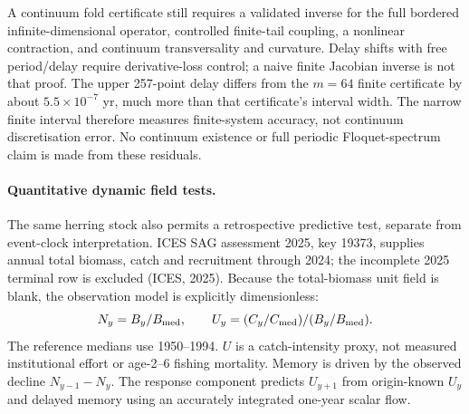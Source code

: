 A continuum fold certificate still requires a validated inverse for the
full bordered infinite-dimensional operator, controlled finite-tail
coupling, a nonlinear contraction, and continuum transversality and
curvature. Delay shifts with free period/delay require derivative-loss
control; a naive finite Jacobian inverse is not that proof. The upper
257-point delay differs from the $m=64$ finite certificate by about
$5.5\times10^{-7}$ yr, much more than that certificate's interval width.
The narrow finite interval therefore measures finite-system accuracy,
not continuum discretisation error. No continuum existence or full
periodic Floquet-spectrum claim is made from these residuals.

\paragraph{Quantitative dynamic field tests.}
The same herring stock also permits a retrospective predictive test,
separate from event-clock interpretation. ICES SAG assessment 2025,
key 19373, supplies annual total biomass, catch and recruitment through
2024; the incomplete 2025 terminal row is excluded (ICES, 2025).
Because the total-biomass unit field is blank, the observation model is
explicitly dimensionless:
\[
 N_y=B_y/B_{\rm med},\qquad
 U_y=(C_y/C_{\rm med})/(B_y/B_{\rm med}).
\]
The reference medians use 1950--1994. $U$ is a catch-intensity proxy,
not measured institutional effort or age-2--6 fishing mortality.
Memory is driven by the observed decline $N_{y-1}-N_y$. The response
component predicts $U_{y+1}$ from origin-known $U_y$ and delayed memory
using an accurately integrated one-year scalar flow.

